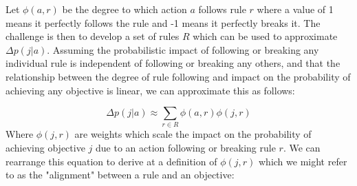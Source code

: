 \documentclass{article}
\begin{document}
Let $\phi(a,r)$ be the degree to which action $a$ follows rule $r$ where a value of 1 means it perfectly follows the rule and -1 means it perfectly breaks it. The challenge is then to develop a set of rules $R$ which can be used to approximate $\Delta p(j|a)$. Assuming the probabilistic impact of following or breaking any individual rule is independent of following or breaking any others, and that the relationship between the degree of rule following and impact on the probability of achieving any objective is linear, we can approximate this as follows:

\begin{equation}
    \Delta p(j|a) \approx \sum\limits_{r\in R} \phi(a,r) \phi(j,r) 
\end{equation}
Where $\phi(j,r)$ are weights which scale the impact on the probability of achieving objective $j$ due to an action following or breaking rule $r$. We can rearrange this equation to derive at a definition of $\phi(j,r)$ which we might refer to as the "alignment" between a rule and an objective:
\end{document}
